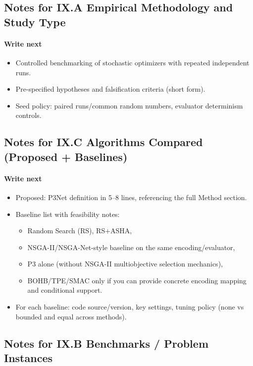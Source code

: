 \subsection*{Notes for IX.A Empirical Methodology and Study Type}
\paragraph{Write next}
\begin{itemize}
  \item Controlled benchmarking of stochastic optimizers with repeated independent runs.
  \item Pre-specified hypotheses and falsification criteria (short form).
  \item Seed policy: paired runs/common random numbers, evaluator determinism controls.
\end{itemize}

\subsection*{Notes for IX.C Algorithms Compared (Proposed + Baselines)}
\paragraph{Write next}
\begin{itemize}
  \item Proposed: P3Net definition in 5--8 lines, referencing the full Method section.
  \item Baseline list with feasibility notes:
  \begin{itemize}
    \item Random Search (RS), RS+ASHA,
    \item NSGA-II/NSGA-Net-style baseline on the same encoding/evaluator,
    \item P3 alone (without NSGA-II multiobjective selection mechanics),
    \item BOHB/TPE/SMAC only if you can provide concrete encoding mapping and conditional support.
  \end{itemize}
  \item For each baseline: code source/version, key settings, tuning policy (none vs bounded and equal across methods).
\end{itemize}

\subsection*{Notes for IX.B Benchmarks / Problem Instances}
